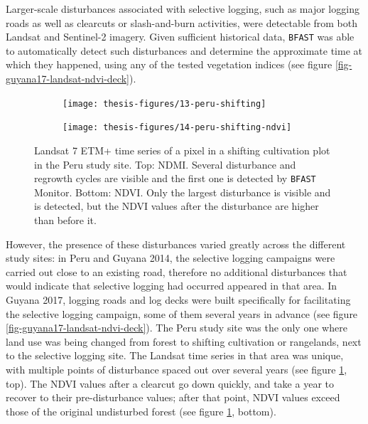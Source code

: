 \documentclass[a4paper,12pt]{scrbook}
\begin{document}
Larger-scale disturbances associated with selective logging, such as major logging roads as well as clearcuts or slash-and-burn activities, were detectable from both Landsat and Sentinel-2 imagery. Given sufficient historical data, \texttt{BFAST} was able to automatically detect such disturbances and determine the approximate time at which they happened, using any of the tested vegetation indices (see figure \ref{fig-guyana17-landsat-ndvi-deck}).

\begin{figure}
  \begin{subfigure}{\textwidth}
    \centering
    \texttt{[image: thesis-figures/13-peru-shifting]}
  \end{subfigure}
  \begin{subfigure}{\textwidth}
    \centering
    \texttt{[image: thesis-figures/14-peru-shifting-ndvi]}
  \end{subfigure}
  \caption{Landsat 7 \ac{ETM+} time series of a pixel in a shifting cultivation plot in the Peru study site. Top: \ac{NDMI}. Several disturbance and regrowth cycles are visible and the first one is detected by \texttt{BFAST} Monitor. Bottom: \ac{NDVI}. Only the largest disturbance is visible and is detected, but the \ac{NDVI} values after the disturbance are higher than before it.}
  \label{fig-peru-shifting-cultivation}
\end{figure}

However, the presence of these disturbances varied greatly across the different study sites: in Peru and Guyana 2014, the selective logging campaigns were carried out close to an existing road, therefore no additional disturbances that would indicate that selective logging had occurred appeared in that area. In Guyana 2017, logging roads and log decks were built specifically for facilitating the selective logging campaign, some of them several years in advance (see figure \ref{fig-guyana17-landsat-ndvi-deck}). The Peru study site was the only one where land use was being changed from forest to shifting cultivation or rangelands, next to the selective logging site. The Landsat time series in that area was unique, with multiple points of disturbance spaced out over several years (see figure \ref{fig-peru-shifting-cultivation}, top). The \ac{NDVI} values after a clearcut go down quickly, and take a year to recover to their pre-disturbance values; after that point, \ac{NDVI} values exceed those of the original undisturbed forest (see figure \ref{fig-peru-shifting-cultivation}, bottom).
\end{document}
